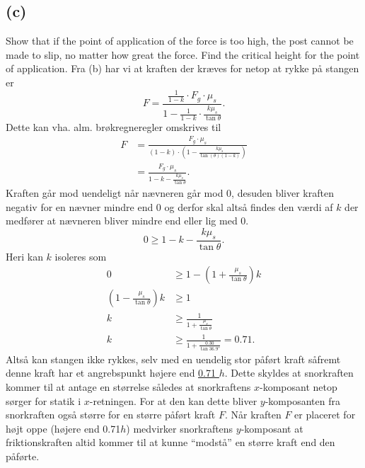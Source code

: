 \documentclass[12pt]{article}
\theoremstyle{definition}
\begin{document}
\subsection*{(c)}
Show that if the point of application of the force is too high, the post cannot be made to slip, no matter how great the force. Find the critical height for the point of application.
\bigbreak
Fra (b) har vi at kraften der kræves for netop at rykke på stangen er
\[ 
F = \frac{\frac{1}{1-k} \cdot F_g \cdot \mu_s}{1 - \frac{1}{1-k}\cdot \frac{k\mu_s}{\tan\theta}}
.\]
Dette kan vha. alm. brøkregneregler omskrives til
\begin{align*}
  F &= \frac{F_g \cdot \mu_s}{\left( 1-k \right) \cdot \left( 1 - \frac{k\mu_s}{\tan(\theta) (1-k)} \right)} \\
  &= \frac{F_g \cdot \mu_s}{1-k - \frac{k\mu_s}{\tan\theta}}
.\end{align*} 
Kraften går mod uendeligt når nævneren går mod 0, desuden bliver kraften negativ for en nævner mindre end 0 og derfor skal altså findes den værdi af $k$ der medfører at nævneren bliver mindre end eller lig med 0.
\[ 
0 \geq 1-k - \frac{k\mu_s}{\tan\theta}
.\]
Heri kan $k$ isoleres som
\begin{align*}
  0 &\geq 1 - \left( 1 + \frac{\mu_s}{\tan\theta} \right)k \\
  \left( 1 - \frac{\mu_s}{\tan\theta} \right) k &\geq 1 \\
  k &\geq \frac{1}{1 + \frac{\mu_s}{\tan\theta}} \\
  k &\geq \frac{1}{1 + \frac{\num{0,30}}{\tan \ang{36,9}}} = \num{0,71} 
.\end{align*}
Altså kan stangen ikke rykkes, selv med en uendelig stor påført kraft såfremt denne kraft har et angrebspunkt højere end \underline{\underline{\num{0,71} $h$}}. Dette skyldes at snorkraften kommer til at antage en størrelse således at snorkraftens $x$-komposant netop sørger for statik i $x$-retningen. For at den kan dette bliver $y$-komposanten fra snorkraften også større for en større påført kraft $F$. Når kraften $F$ er placeret for højt oppe (højere end \num{0,71}$h$) medvirker snorkraftens $y$-komposant at friktionskraften altid kommer til at kunne ``modstå'' en større kraft end den påførte.
\end{document}
